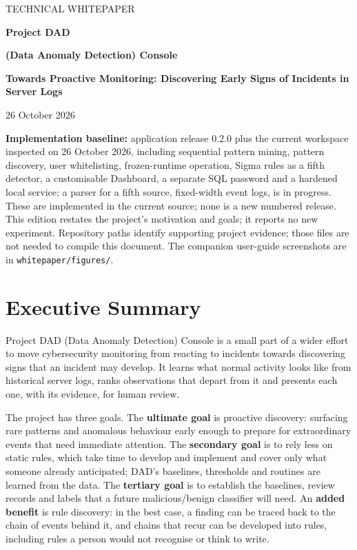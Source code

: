 \documentclass[11pt,a4paper]{article}
\begin{document}
\begin{titlepage}
\thispagestyle{empty}
{\small\sffamily\color{accent} TECHNICAL WHITEPAPER\par}
\vspace{1.8cm}
{\Huge\bfseries\color{ink} Project DAD\par}
\vspace{0.3cm}
{\Large\bfseries\color{ink} (Data Anomaly Detection) Console\par}
\vspace{0.7cm}
{\LARGE\bfseries Towards Proactive Monitoring: Discovering Early Signs of Incidents in Server Logs\par}
\vspace{1.0cm}
{\large 26 October 2026\par}
\vspace{1.6cm}
\textbf{Implementation baseline:} application release 0.2.0 plus the current workspace inspected on 26 October 2026, including sequential pattern mining, pattern discovery, user whitelisting, frozen-runtime operation, Sigma rules as a fifth detector, a customisable Dashboard, a separate SQL password and a hardened local service; a parser for a fifth source, fixed-width event logs, is in progress. These are implemented in the current source; none is a new numbered release. This edition restates the project's motivation and goals; it reports no new experiment.
\vfill
{\small Repository paths identify supporting project evidence; those files are not needed to compile this document. The companion user-guide screenshots are in \nolinkurl{whitepaper/figures/}.}
\end{titlepage}

\section*{Executive Summary}

Project DAD (Data Anomaly Detection) Console is a small part of a wider effort to move cybersecurity monitoring from reacting to incidents towards discovering signs that an incident may develop. It learns what normal activity looks like from historical server logs, ranks observations that depart from it and presents each one, with its evidence, for human review.

The project has three goals. The \textbf{ultimate goal} is proactive discovery: surfacing rare patterns and anomalous behaviour early enough to prepare for extraordinary events that need immediate attention. The \textbf{secondary goal} is to rely less on static rules, which take time to develop and implement and cover only what someone already anticipated; DAD's baselines, thresholds and routines are learned from the data. The \textbf{tertiary goal} is to establish the baselines, review records and labels that a future malicious/benign classifier will need. An \textbf{added benefit} is rule discovery: in the best case, a finding can be traced back to the chain of events behind it, and chains that recur can be developed into rules, including rules a person would not recognise or think to write.
\end{document}
